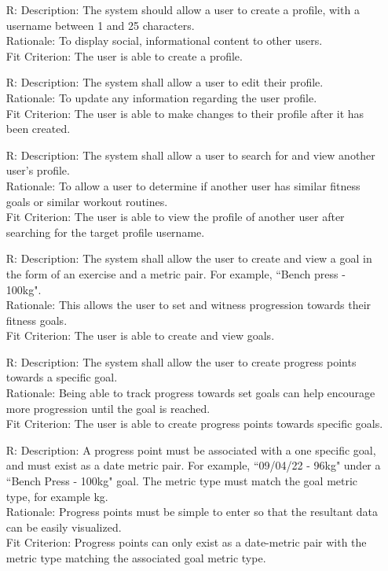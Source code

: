 \documentclass[12pt]{article}
\newcounter{reqnum} %
\begin{document}
\begin{itemize}
\item[R\refstepcounter{reqnum}\thereqnum \label{R_Inputs}:]
Description: The system should allow a user to create a profile, with a username between 1 and 25 characters.
\\ Rationale: To display social, informational content to other users.
\\ Fit Criterion: The user is able to create a profile.

\item[R\refstepcounter{reqnum}\thereqnum \label{R_Inputs}:]
Description: The system shall allow a user to edit their profile.
\\ Rationale: To update any information regarding the user profile.
\\ Fit Criterion: The user is able to make changes to their profile after it has been created. 

\item[R\refstepcounter{reqnum}\thereqnum \label{R_Inputs}:]
Description: The system shall allow a user to search for and view another user's profile.
\\ Rationale: To allow a user to determine if another user has similar fitness goals or similar workout routines.
\\ Fit Criterion: The user is able to view the profile of another user after searching for the target profile username.

\item[R\refstepcounter{reqnum}\thereqnum \label{R_Inputs}:]
Description: The system shall allow the user to create and view a goal in the form of an exercise and a metric pair. For example, ``Bench press - 100kg".
\\ Rationale: This allows the user to set and witness progression towards their fitness goals.
\\ Fit Criterion: The user is able to create and view goals.

\item[R\refstepcounter{reqnum}\thereqnum \label{R_Inputs}:]
Description: The system shall allow the user to create progress points towards a specific goal.
\\ Rationale: Being able to track progress towards set goals can help encourage more progression until the goal is reached.
\\ Fit Criterion: The user is able to create progress points towards specific goals.

\item[R\refstepcounter{reqnum}\thereqnum \label{R_Inputs}:]
Description: A progress point must be associated with a one specific goal, and must exist as a date metric pair. For example, ``09/04/22 - 96kg" under a ``Bench Press - 100kg" goal. The metric type must match the goal metric type, for example kg.
\\ Rationale: Progress points must be simple to enter so that the resultant data can be easily visualized.
\\ Fit Criterion: Progress points can only exist as a date-metric pair with the metric type matching the associated goal metric type.


\end{itemize}
\end{document}
